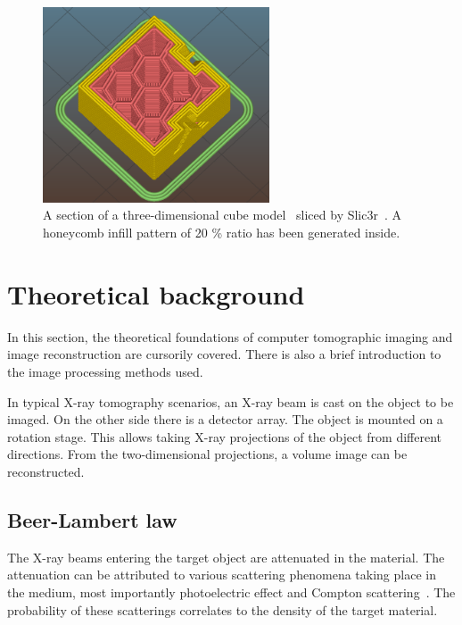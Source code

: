 \documentclass[a4paper,twoside,12pt]{article}
\begin{document}
\begin{figure}
    \centering
    \includegraphics[width=0.6\textwidth]{images/cube_slic3r.png}
    \caption{A section of a three-dimensional cube model~\cite{testcube} sliced by Slic3r~\cite{slic3r}. A honeycomb infill pattern of 20 \% ratio has been generated inside.}
    \label{fig:honeycomb}
\end{figure}

\section{Theoretical background}
In this section, the theoretical foundations of computer tomographic imaging and image reconstruction are cursorily covered. There is also a brief introduction to the image processing methods used.

In typical X-ray tomography scenarios, an X-ray beam is cast on the object to be imaged. On the other side there is a detector array. The object is mounted on a rotation stage. This allows taking X-ray projections of the object from different directions. From the two-dimensional projections, a volume image can be reconstructed.

\subsection{Beer-Lambert law}
The X-ray beams entering the target object are attenuated in the material. The attenuation can be attributed to various scattering phenomena taking place in the medium, most importantly photoelectric effect and Compton scattering~\cite{lectures}. The probability of these scatterings correlates to the density of the target material.
\end{document}
